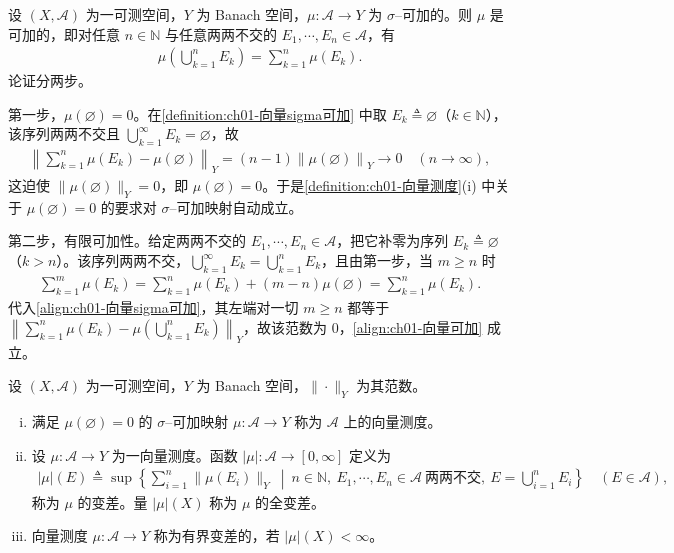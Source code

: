 \documentclass[../../main.tex]{subfiles}%
\begin{document}
\begin{remark}\label{remark:ch01-向量可加}
设 $(X,\mathcal{A})$ 为一可测空间，$Y$ 为 Banach 空间，$\mu:\mathcal{A}\to Y$ 为 $\sigma$--可加的。则 $\mu$ 是可加的，即对任意 $n\in\mathbb{N}$ 与任意两两不交的 $E_1,\cdots ,E_n\in\mathcal{A}$，有
\begin{align}
\mu\left(\bigcup_{k=1}^n E_k\right)=\sum_{k=1}^n\mu(E_k). \label{align:ch01-向量可加}
\end{align}
论证分两步。

第一步，$\mu(\varnothing)=0$。在\cref{definition:ch01-向量sigma可加} 中取 $E_k\triangleq\varnothing$（$k\in\mathbb{N}$），该序列两两不交且 $\bigcup_{k=1}^\infty E_k=\varnothing$，故
\begin{align*}
\left\|\sum_{k=1}^n\mu(E_k)-\mu(\varnothing)\right\|_Y=(n-1)\left\|\mu(\varnothing)\right\|_Y\longrightarrow0\quad(n\to\infty),
\end{align*}
这迫使 $\|\mu(\varnothing)\|_Y=0$，即 $\mu(\varnothing)=0$。于是\cref{definition:ch01-向量测度}(i) 中关于 $\mu(\varnothing)=0$ 的要求对 $\sigma$--可加映射自动成立。

第二步，有限可加性。给定两两不交的 $E_1,\cdots ,E_n\in\mathcal{A}$，把它补零为序列 $E_k\triangleq\varnothing$（$k>n$）。该序列两两不交，$\bigcup_{k=1}^\infty E_k=\bigcup_{k=1}^n E_k$，且由第一步，当 $m\geqslant n$ 时
\begin{align*}
\sum_{k=1}^m\mu(E_k)=\sum_{k=1}^n\mu(E_k)+(m-n)\mu(\varnothing)=\sum_{k=1}^n\mu(E_k).
\end{align*}
代入\eqref{align:ch01-向量sigma可加}，其左端对一切 $m\geqslant n$ 都等于 $\left\|\sum_{k=1}^n\mu(E_k)-\mu\left(\bigcup_{k=1}^n E_k\right)\right\|_Y$，故该范数为 $0$，\eqref{align:ch01-向量可加} 成立。
\end{remark}

\begin{definition}\label{definition:ch01-向量测度}
设 $(X,\mathcal{A})$ 为一可测空间，$Y$ 为 Banach 空间，$\|\cdot\|_Y$ 为其范数。
\begin{enumerate}[(i)]
\item 满足 $\mu(\varnothing)=0$ 的 $\sigma$--可加映射 $\mu:\mathcal{A}\to Y$ 称为 $\mathcal{A}$ 上的向量测度。
\item 设 $\mu:\mathcal{A}\to Y$ 为一向量测度。函数 $|\mu|:\mathcal{A}\to[0,\infty]$ 定义为
\begin{align}
|\mu|(E)\triangleq\sup\left\{\sum_{i=1}^n\|\mu(E_i)\|_Y\ \middle|\ n\in\mathbb{N},\ E_1,\cdots ,E_n\in\mathcal{A}\ \text{两两不交},\ E=\bigcup_{i=1}^n E_i\right\}\quad(E\in\mathcal{A}), \label{align:ch01-向量变差}
\end{align}
称为 $\mu$ 的变差。量 $|\mu|(X)$ 称为 $\mu$ 的全变差。
\item 向量测度 $\mu:\mathcal{A}\to Y$ 称为有界变差的，若 $|\mu|(X)<\infty$。
\end{enumerate}
\end{definition}
\end{document}
